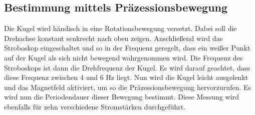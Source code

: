 \subsection{Bestimmung mittels Präzessionsbewegung}

Die Kugel wird händisch in eine Rotationsbewegung versetzt. Dabei soll die Drehachse konstant senkrecht nach oben zeigen.
Anschließend wird das Stroboskop eingeschaltet und so in der Frequenz geregelt, dass ein weißer Punkt auf der Kugel als sich nicht bewegend wahrgenommen wird. Die Frequenz des Stroboskops ist dann die Drehfrequenz der Kugel.
Es wird darauf geachtet, dass diese Frequenz zwischen 4 und 6 Hz liegt.
Nun wird die Kugel leicht ausgelenkt und das Magnetfeld aktiviert, um so die Präzessionsbewegung hervorzurufen.
Es wird nun die Periodendauer dieser Bewegung bestimmt.
Diese Messung wird ebenfalls für zehn verschiedene Stromstärken durchgeführt.